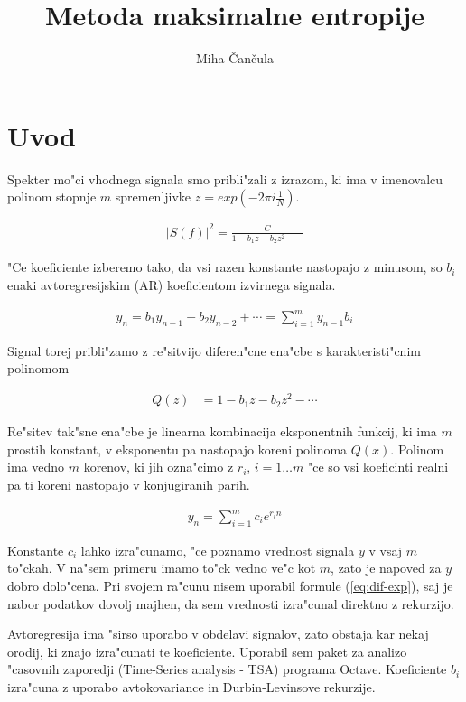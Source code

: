 \documentclass[a4paper,10pt]{article}
\title{Metoda maksimalne entropije}
\author{Miha \v Can\v cula}
\begin{document}
\maketitle

\section{Uvod}

Spekter mo"ci vhodnega signala smo pribli"zali z izrazom, ki ima v imenovalcu polinom stopnje $m$ spremenljivke $z = exp(-2
\pi i \frac{1}{N})$. 

\begin{align}
  \label{eq:polinom}
 |S(f)|^2 = \frac{C}{1 - b_1 z - b_2 z^2 - \cdots}
\end{align}

"Ce koeficiente izberemo tako, da vsi razen konstante nastopajo z minusom, so $b_i$ enaki avtoregresijskim (AR) koeficientom izvirnega signala.

\begin{align}
 y_n = b_1 y_{n-1} + b_2 y_{n-2} + \cdots = \sum_{i=1}^m y_{n-1} b_i
\end{align}

Signal torej pribli"zamo z re"sitvijo diferen"cne ena"cbe s karakteristi"cnim polinomom

\begin{align}
 Q(z) &= 1 - b_1 z - b_2 z^2 - \cdots
\end{align}

Re"sitev tak"sne ena"cbe je linearna kombinacija eksponentnih funkcij, ki ima $m$ prostih konstant, v eksponentu pa nastopajo koreni polinoma $Q(x)$. Polinom ima vedno $m$ korenov, ki jih ozna"cimo z $r_i$, $i=1\ldots m$ "ce so vsi koeficinti realni pa ti koreni nastopajo v konjugiranih parih.  

\begin{align}
\label{eq:dif-exp}
 y_n = \sum_{i=1}^{m} c_i e^{r_i n}
\end{align}

Konstante $c_i$ lahko izra"cunamo, "ce poznamo vrednost signala $y$ v vsaj $m$ to"ckah. V na"sem primeru imamo to"ck vedno ve"c kot $m$, zato je napoved za $y$ dobro dolo"cena. Pri svojem ra"cunu nisem uporabil formule (\ref{eq:dif-exp}), saj je nabor podatkov dovolj majhen, da sem vrednosti izra"cunal direktno z rekurzijo. 

Avtoregresija ima "sirso uporabo v obdelavi signalov, zato obstaja kar nekaj orodij, ki znajo izra"cunati te koeficiente. Uporabil sem paket za analizo "casovnih zaporedji (Time-Series analysis - TSA) programa Octave. Koeficiente $b_i$ izra"cuna z uporabo avtokovariance in Durbin-Levinsove rekurzije. 
\end{document}
